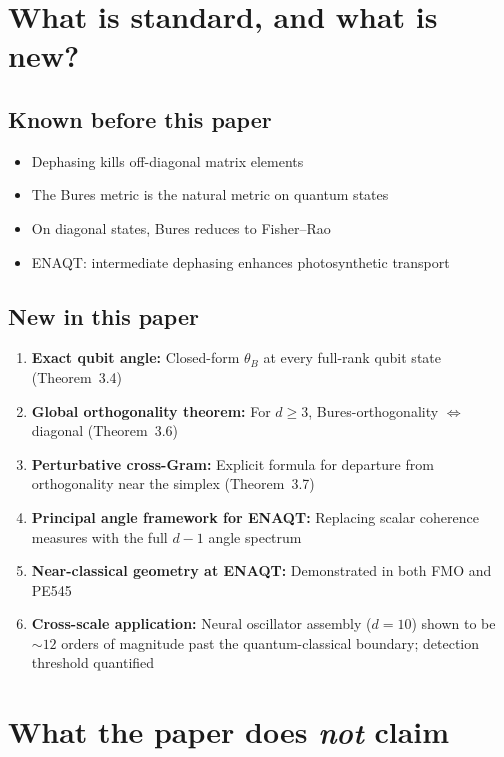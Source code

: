 \documentclass[11pt,a4paper]{article}
\begin{document}
\section*{What is standard, and what is new?}

\subsection*{Known before this paper}

\begin{itemize}[leftmargin=1.5em]
\item Dephasing kills off-diagonal matrix elements
\item The Bures metric is the natural metric on quantum states
\item On diagonal states, Bures reduces to Fisher--Rao
\item ENAQT: intermediate dephasing enhances photosynthetic transport
\end{itemize}

\subsection*{New in this paper}

\begin{enumerate}[leftmargin=1.5em]
\item \textbf{Exact qubit angle:} Closed-form $\theta_B$ at every full-rank qubit state (Theorem~3.4)
\item \textbf{Global orthogonality theorem:} For $d \geq 3$, Bures-orthogonality $\iff$ diagonal (Theorem~3.6)
\item \textbf{Perturbative cross-Gram:} Explicit formula for departure from orthogonality near the simplex (Theorem~3.7)
\item \textbf{Principal angle framework for ENAQT:} Replacing scalar coherence measures with the full $d{-}1$ angle spectrum
\item \textbf{Near-classical geometry at ENAQT:} Demonstrated in both FMO and PE545
\item \textbf{Cross-scale application:} Neural oscillator assembly ($d = 10$) shown to be ${\sim}12$ orders of magnitude past the quantum-classical boundary; detection threshold quantified
\end{enumerate}

\section*{What the paper does \emph{not} claim}
\end{document}
